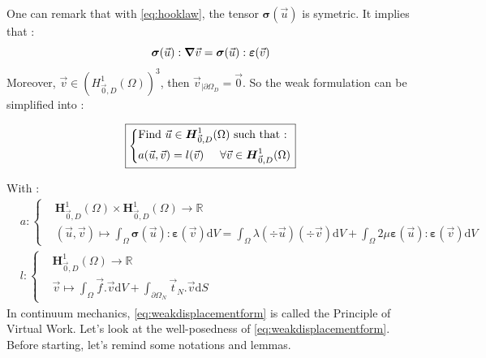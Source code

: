 \documentclass[a4paper,12pt,twoside]{report}
\newcommand{\mtr}{\mathbb{R}}
\newcommand{\dif}{\mathrm{d}}
\begin{document}
One can remark that with \eqref{eq:hooklaw}, the tensor $\boldsymbol \sigma (\vec u)$ is symetric. It implies that : 
$$\boldsymbol \sigma (\vec u) : \grad \vec v = \boldsymbol \sigma(\vec u) : \boldsymbol \varepsilon (\vec v)$$
Moreover, $\vec v \in \left(H^1_{\vec 0,D}(\Omega) \right)^3$, then $\vec v_{|\partial\Omega_D} = \vec 0$. So the weak formulation can be simplified into : 

\begin{equation}
\label{eq:weakdisplacementform}
\boxed{
\left\{
    \begin{aligned}
    &\text{Find } \vec u \in \boldsymbol H^1_{\vec 0,D}(\Omega) \text{ such that :}\\
    & a(\vec u,\vec v) = l(\vec v) \hspace{0.5cm} \forall \vec v \in \boldsymbol H^1_{\vec 0,D}(\Omega)
    \end{aligned}
\right.
}
\end{equation}

With : 
\begin{equation*}
    \begin{aligned}
        & a : \left\{
        \begin{aligned}
            &\boldsymbol H^1_{\vec 0,D}(\Omega) \times \boldsymbol H^1_{\vec 0,D}(\Omega)  \rightarrow \mtr \\
            &(\vec u,\vec v)  \longmapsto \int_\Omega \boldsymbol \sigma(\vec u) : \boldsymbol \varepsilon (\vec v) \dif V = \int_\Omega \lambda (\div \vec u) (\div \vec v) \dif V+ \int_\Omega 2\mu \boldsymbol \varepsilon(\vec u): \boldsymbol \varepsilon (\vec v)\dif V
        \end{aligned}
        \right. \\[0.3cm]
    & l : \left\{
        \begin{aligned}
            &\boldsymbol H^1_{\vec 0,D}(\Omega) \rightarrow \mtr \\
            &\vec v \longmapsto \int_\Omega \vec f . \vec v \dif V + \int_{\partial\Omega_N} \vec t_N.\vec v \dif S
        \end{aligned}
        \right.
    \end{aligned}
\end{equation*}
In continuum mechanics, \eqref{eq:weakdisplacementform} is called the Principle of Virtual Work. Let's look at the well-posedness of \eqref{eq:weakdisplacementform}. Before starting, let's remind some notations and lemmas. \\
\end{document}
